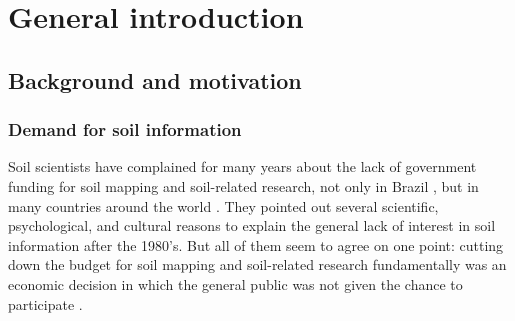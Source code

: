 \setcounter{page}{1}
\artigofalse
\chapter{General introduction}
\label{chap:introduction}


\section{Background and motivation}

\subsection{Demand for soil information}

Soil scientists have complained for many years about the lack of government funding for soil mapping
and soil-related research, not only in Brazil \citep{Dalmolin1999, Ker1999, KerEtAl2003, 
Mendonca-SantosEtAl2003, Ramos2003, Espindola2008}, but in many countries around the world 
\citep{Basher1997, HarteminkEtAl2008, Grunwald2009, SanchezEtAl2009, Finke2012}. They pointed out 
several scientific, psychological, and cultural reasons to explain the general lack of interest in 
soil information after the 1980's. But all of them seem to agree on one point: cutting down the 
budget for soil mapping and soil-related research fundamentally was an economic decision in which 
the general public was not given the chance to participate \citep{SamuelRosa2012}.

